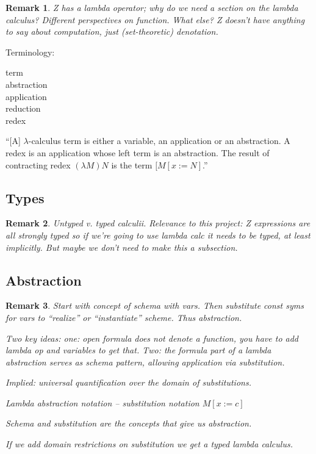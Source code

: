 \documentclass[12pt]{tufte-handout}
\numberwithin{equation}{subsection}
\numberwithin{equation}{subsection}
\newtheorem{remark}{Remark}
\begin{document}
\begin{remark}
  Z has a lambda operator; why do we need a section on the lambda
  calculus?  Different perspectives on function.  What else?  Z
  doesn't have anything to say about computation, just (set-theoretic)
  denotation.
\end{remark}

Terminology:
\begin{description}
\item [term]
\item [abstraction]
\item [application]
\item [reduction]
\item [redex]
\end{description}

``[A] \(\lambda\)-calculus term is either a variable, an application
or an abstraction.  A redex is an application whose left term is an
abstraction.  The result of contracting redex \((\lambda M) N\) is the
term \([M[x:=N]\).''

  \subsection{Types}
  \label{subs:lambdatypes}

  \begin{remark}
    Untyped v. typed calculii.  Relevance to this project: Z expressions
    are all strongly typed so if we're going to use lambda calc it needs
    to be typed, at least implicitly.  But maybe we don't need to make
    this a subsection.
  \end{remark}

  \subsection{Abstraction}
  \label{subs:lambda}

  \begin{remark}
    Start with concept of schema with vars.  Then substitute const syms
    for vars to ``realize'' or ``instantiate'' scheme.  Thus
    abstraction.

    Two key ideas: one: open formula does not denote a function, you
    have to add lambda op \textit{and variables} to get that.  Two: the
    formula part of a lambda abstraction serves as schema pattern,
    allowing application via substitution.

    Implied: universal quantification over the domain of substitutions.

    Lambda abstraction notation -- substitution notation \(M[x:=c]\)

    Schema and substitution are the concepts that give us abstraction.

    If we add domain restrictions on substitution we get a typed lambda
    calculus.


  \end{remark}
\end{document}
